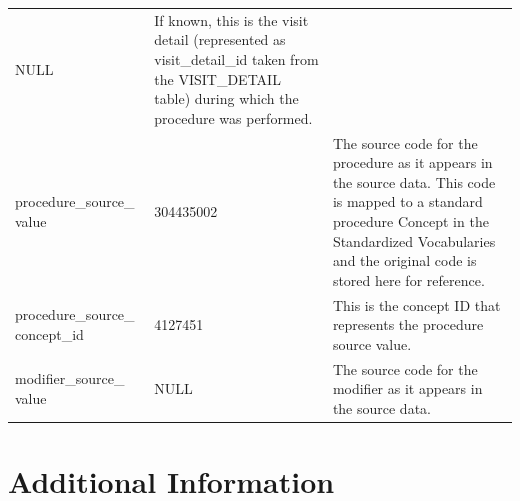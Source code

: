 \documentclass[11pt]{book}
\theoremstyle{definition}
\theoremstyle{definition}
\theoremstyle{definition}
\theoremstyle{remark}
\begin{document}
\begin{longtable}[]{@{}lll@{}}
\begin{minipage}[t]{0.15\columnwidth}
NULL\strut
\end{minipage} & \begin{minipage}[t]{0.49\columnwidth}\raggedright
If known, this is the visit detail (represented as visit\_detail\_id taken from the VISIT\_DETAIL table) during which the procedure was performed.\strut
\end{minipage}\tabularnewline
\begin{minipage}[t]{0.28\columnwidth}\raggedright
procedure\_source\_ value\strut
\end{minipage} & \begin{minipage}[t]{0.15\columnwidth}\raggedright
304435002\strut
\end{minipage} & \begin{minipage}[t]{0.49\columnwidth}\raggedright
The source code for the procedure as it appears in the source data. This code is mapped to a standard procedure Concept in the Standardized Vocabularies and the original code is stored here for reference.\strut
\end{minipage}\tabularnewline
\begin{minipage}[t]{0.28\columnwidth}\raggedright
procedure\_source\_ concept\_id\strut
\end{minipage} & \begin{minipage}[t]{0.15\columnwidth}\raggedright
4127451\strut
\end{minipage} & \begin{minipage}[t]{0.49\columnwidth}\raggedright
This is the concept ID that represents the procedure source value.\strut
\end{minipage}\tabularnewline
\begin{minipage}[t]{0.28\columnwidth}\raggedright
modifier\_source\_ value\strut
\end{minipage} & \begin{minipage}[t]{0.15\columnwidth}\raggedright
NULL\strut
\end{minipage} & \begin{minipage}[t]{0.49\columnwidth}\raggedright
The source code for the modifier as it appears in the source data.\strut
\end{minipage}\tabularnewline
\bottomrule
\end{longtable}

\hypertarget{additional-information}{%
\section{Additional Information}\label{additional-information}}
\end{document}
